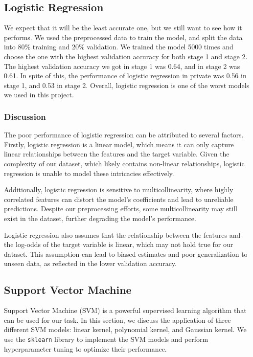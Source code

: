 \documentclass[11pt,a4paper]{article}
\begin{document}
\subsection{Logistic Regression}
We expect that it will be the least accurate one, but we still want to see how it performs.
We used the preprocessed data to train the model, and split the data into 80\% training and 20\% validation.
We trained the model 5000 times and choose the one with the highest validation accuracy for both stage 1 and stage 2.
The highest validation accuracy we got in stage 1 was 0.64, and in stage 2 was 0.61.
In spite of this, the performance of logistic regression in private was 0.56 in stage 1, and 0.53 in stage 2.
Overall, logistic regression is one of the worst models we used in this project.

\subsubsection{Discussion}

The poor performance of logistic regression can be attributed to several factors. Firstly, logistic regression is a linear model, which means it can only capture linear relationships between the features and the target variable. Given the complexity of our dataset, which likely contains non-linear relationships, logistic regression is unable to model these intricacies effectively.

Additionally, logistic regression is sensitive to multicollinearity, where highly correlated features can distort the model's coefficients and lead to unreliable predictions. Despite our preprocessing efforts, some multicollinearity may still exist in the dataset, further degrading the model's performance.

Logistic regression also assumes that the relationship between the features and the log-odds of the target variable is linear, which may not hold true for our dataset. This assumption can lead to biased estimates and poor generalization to unseen data, as reflected in the lower validation accuracy.

\subsection{Support Vector Machine}

Support Vector Machine (SVM) is a powerful supervised learning algorithm that can be used for our task. In this section, we discuss the application of three different SVM models: linear kernel, polynomial kernel, and Gaussian kernel. We use the \texttt{sklearn} library to implement the SVM models and perform hyperparameter tuning to optimize their performance.
\end{document}

